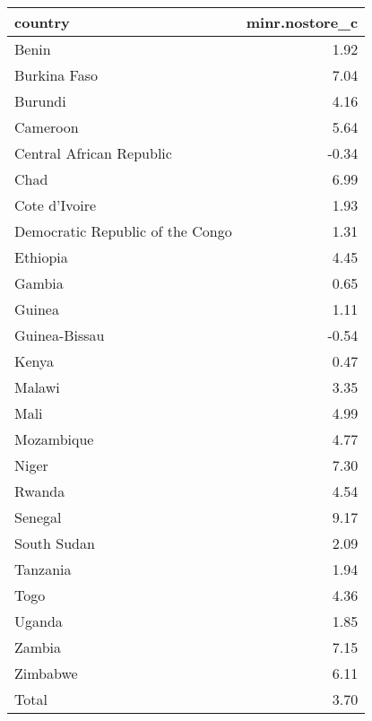 \begin{table}[ht]
\centering
\begin{tabular}{lr}
  \hline
country & minr.nostore\_c \\ 
  \hline
Benin & 1.92 \\ 
  Burkina Faso & 7.04 \\ 
  Burundi & 4.16 \\ 
  Cameroon & 5.64 \\ 
  Central African Republic & -0.34 \\ 
  Chad & 6.99 \\ 
  Cote d'Ivoire & 1.93 \\ 
  Democratic Republic of the Congo & 1.31 \\ 
  Ethiopia & 4.45 \\ 
  Gambia & 0.65 \\ 
  Guinea & 1.11 \\ 
  Guinea-Bissau & -0.54 \\ 
  Kenya & 0.47 \\ 
  Malawi & 3.35 \\ 
  Mali & 4.99 \\ 
  Mozambique & 4.77 \\ 
  Niger & 7.30 \\ 
  Rwanda & 4.54 \\ 
  Senegal & 9.17 \\ 
  South Sudan & 2.09 \\ 
  Tanzania & 1.94 \\ 
  Togo & 4.36 \\ 
  Uganda & 1.85 \\ 
  Zambia & 7.15 \\ 
  Zimbabwe & 6.11 \\ 
  Total & 3.70 \\ 
   \hline
\end{tabular}
\end{table}
